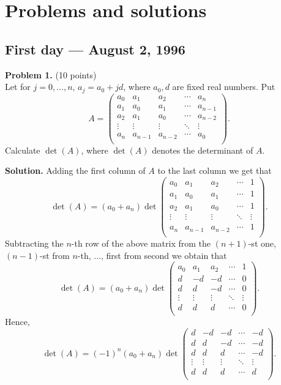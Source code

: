 \documentclass{article}
\begin{document}
\pagestyle{plain}

\section*{Problems and solutions}

\subsection*{First day — August 2, 1996}

\textbf{Problem 1.} (10 points)\\
Let for $j = 0,\ldots,n$, $a_j = a_0 + jd$, where $a_0, d$ are fixed real numbers. Put
\[
A = \begin{pmatrix}
a_0 & a_1 & a_2 & \cdots & a_n \\
a_1 & a_0 & a_1 & \cdots & a_{n-1} \\
a_2 & a_1 & a_0 & \cdots & a_{n-2} \\
\vdots & \vdots & \vdots & \ddots & \vdots \\
a_n & a_{n-1} & a_{n-2} & \cdots & a_0 \\
\end{pmatrix}.
\]
Calculate $\det(A)$, where $\det(A)$ denotes the determinant of $A$.

\textbf{Solution.} Adding the first column of $A$ to the last column we get that
\[
\det(A) = (a_0 + a_n) \det \begin{pmatrix}
a_0 & a_1 & a_2 & \cdots & 1 \\
a_1 & a_0 & a_1 & \cdots & 1 \\
a_2 & a_1 & a_0 & \cdots & 1 \\
\vdots & \vdots & \vdots & \ddots & \vdots \\
a_n & a_{n-1} & a_{n-2} & \cdots & 1 \\
\end{pmatrix}.
\]
Subtracting the $n$-th row of the above matrix from the $(n+1)$-st one, $(n-1)$-st from $n$-th, $\ldots$, first from second we obtain that
\[
\det(A) = (a_0 + a_n) \det \begin{pmatrix}
a_0 & a_1 & a_2 & \cdots & 1 \\
d & -d & -d & \cdots & 0 \\
d & d & -d & \cdots & 0 \\
\vdots & \vdots & \vdots & \ddots & \vdots \\
d & d & d & \cdots & 0 \\
\end{pmatrix}.
\]
Hence,
\[
\det(A) = (-1)^n (a_0 + a_n) \det \begin{pmatrix}
d & -d & -d & \cdots & -d \\
d & d & -d & \cdots & -d \\
d & d & d & \cdots & -d \\
\vdots & \vdots & \vdots & \ddots & \vdots \\
d & d & d & \cdots & d \\
\end{pmatrix}.
\]
\end{document}
